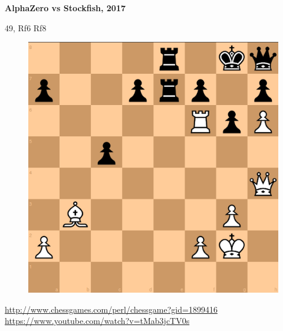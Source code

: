 \documentclass[xcolor=dvipsnames]{beamer}
\begin{document}
\begin{frame}{\bf AlphaZero vs Stockfish, 2017}

49, Rf6 Rf8 \\
\begin{figure}[!htb]
  \centering
  \includegraphics[scale=0.25]{../../pictures/AlphaZero_Stockfish_2017_02.png}
\end{figure}

\url{http://www.chessgames.com/perl/chessgame?gid=1899416}
\url{https://www.youtube.com/watch?v=tMab3jcTV0s}

\end{frame}
\end{document}

